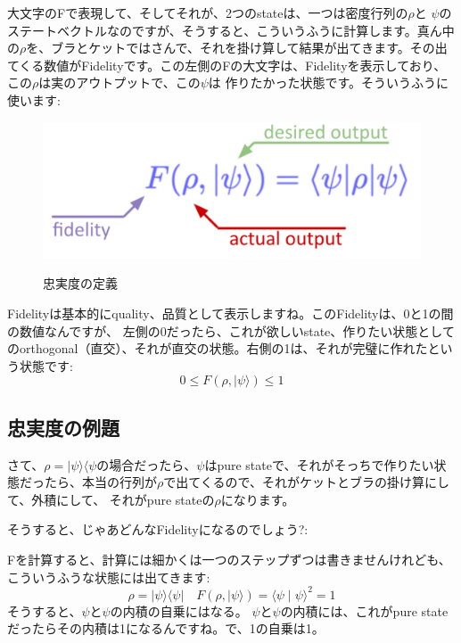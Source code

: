 大文字のFで表現して、そしてそれが、2つのstateは、一つは密度行列の$\rho$と
$\psi$のステートベクトルなのですが、そうすると、こういうふうに計算します。真ん中の$\rho$を、ブラとケットではさんで、それを掛け算して結果が出てきます。その出てくる数値がFidelityです。この左側のFの大文字は、Fidelityを表示しており、この$\rho$は実のアウトプットで、この$\psi$は
作りたかった状態です。そういうふうに使います:
\begin{figure}[H]
    \centering
    \includegraphics[width=1.0\textwidth]{lesson3/Annotated_Fidelity_defn.pdf}
    \label{fig: 1}
    \begin{center}
        \caption{忠実度の定義}
    \end{center}
\end{figure}

Fidelityは基本的にquality、品質として表示しますね。このFidelityは、0と1の間の数値なんですが、
左側の0だったら、これが欲しいstate、作りたい状態としてのorthogonal（直交）、それが直交の状態。右側の1は、それが完璧に作れたという状態です:
\begin{equation}
0 \leq F(\rho,|\psi\rangle) \leq 1
\end{equation}

\subsection{忠実度の例題}
さて、$\rho=|\psi\rangle\langle\psi$の場合だったら、$\psi$はpure stateで、それがそっちで作りたい状態だったら、本当の行列が$\rho$で出てくるので、それがケットとブラの掛け算にして、外積にして、
それがpure stateの$\rho$になります。

そうすると、じゃあどんなFidelityになるのでしょう?:

Fを計算すると、計算には細かくは一つのステップずつは書きませんけれども、
こういうふうな状態には出てきます:
\begin{equation}
\rho=|\psi\rangle\langle\psi| \quad F(\rho,|\psi\rangle)=\langle\psi \mid \psi\rangle^{2}=1
\end{equation}
そうすると、$\psi$と$\psi$の内積の自乗にはなる。
$\psi$と$\psi$の内積には、これがpure stateだったらその内積は1になるんですね。で、1の自乗は1。

